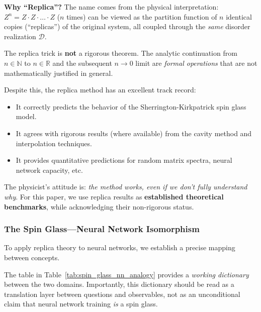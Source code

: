 \documentclass[
  journal=largetwo,
  simfonts=false,
  year=2025,
  volume=37,
]{cup-journal}
\begin{document}
\textbf{Why ``Replica''?} The name comes from the physical interpretation: $Z^n = Z \cdot Z \cdot \ldots \cdot Z$ ($n$ times) can be viewed as the partition function of $n$ identical copies (``replicas'') of the original system, all coupled through the \textit{same} disorder realization $\mathcal{D}$.

\begin{remark}
The replica trick is \textbf{not} a rigorous theorem. The analytic continuation from $n \in \mathbb{N}$ to $n \in \mathbb{R}$ and the subsequent $n \to 0$ limit are \textit{formal operations} that are not mathematically justified in general.

Despite this, the replica method has an excellent track record:
\begin{itemize}
    \item It correctly predicts the behavior of the Sherrington-Kirkpatrick spin glass model.
    \item It agrees with rigorous results (where available) from the cavity method and interpolation techniques.
    \item It provides quantitative predictions for random matrix spectra, neural network capacity, etc.
\end{itemize}

The physicist's attitude is: \textit{the method works, even if we don't fully understand why}. For this paper, we use replica results as \textbf{established theoretical benchmarks}, while acknowledging their non-rigorous status.
\end{remark}

\subsubsection{The Spin Glass---Neural Network Isomorphism}

To apply replica theory to neural networks, we establish a precise mapping between concepts.

\begin{definition}\label{def:spin_glass_dictionary}
The table in Table~\ref{tab:spin_glass_nn_analogy} provides a \emph{working dictionary} between the two domains. Importantly, this dictionary should be read as a translation layer between questions and observables, not as an unconditional claim that neural network training \emph{is} a spin glass.
\end{definition}
\end{document}
